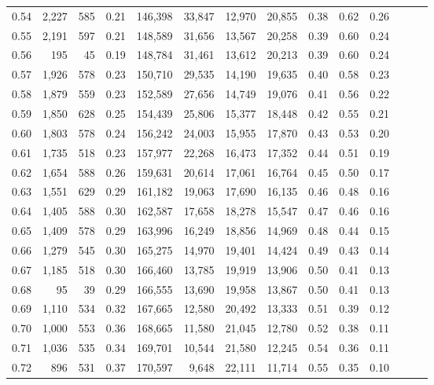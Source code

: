 \begin{tabular}{rrrrrrrrrrrrrr}
0.54 &  2,227 &  585 &  0.21 &  146,398 &   33,847 &  12,970 &  20,855 &  0.38 &  0.62 &      0.26 \\
0.55 &  2,191 &  597 &  0.21 &  148,589 &   31,656 &  13,567 &  20,258 &  0.39 &  0.60 &      0.24 \\
0.56 &    195 &   45 &  0.19 &  148,784 &   31,461 &  13,612 &  20,213 &  0.39 &  0.60 &      0.24 \\
0.57 &  1,926 &  578 &  0.23 &  150,710 &   29,535 &  14,190 &  19,635 &  0.40 &  0.58 &      0.23 \\
0.58 &  1,879 &  559 &  0.23 &  152,589 &   27,656 &  14,749 &  19,076 &  0.41 &  0.56 &      0.22 \\
0.59 &  1,850 &  628 &  0.25 &  154,439 &   25,806 &  15,377 &  18,448 &  0.42 &  0.55 &      0.21 \\
0.60 &  1,803 &  578 &  0.24 &  156,242 &   24,003 &  15,955 &  17,870 &  0.43 &  0.53 &      0.20 \\
0.61 &  1,735 &  518 &  0.23 &  157,977 &   22,268 &  16,473 &  17,352 &  0.44 &  0.51 &      0.19 \\
0.62 &  1,654 &  588 &  0.26 &  159,631 &   20,614 &  17,061 &  16,764 &  0.45 &  0.50 &      0.17 \\
0.63 &  1,551 &  629 &  0.29 &  161,182 &   19,063 &  17,690 &  16,135 &  0.46 &  0.48 &      0.16 \\
0.64 &  1,405 &  588 &  0.30 &  162,587 &   17,658 &  18,278 &  15,547 &  0.47 &  0.46 &      0.16 \\
0.65 &  1,409 &  578 &  0.29 &  163,996 &   16,249 &  18,856 &  14,969 &  0.48 &  0.44 &      0.15 \\
0.66 &  1,279 &  545 &  0.30 &  165,275 &   14,970 &  19,401 &  14,424 &  0.49 &  0.43 &      0.14 \\
0.67 &  1,185 &  518 &  0.30 &  166,460 &   13,785 &  19,919 &  13,906 &  0.50 &  0.41 &      0.13 \\
0.68 &     95 &   39 &  0.29 &  166,555 &   13,690 &  19,958 &  13,867 &  0.50 &  0.41 &      0.13 \\
0.69 &  1,110 &  534 &  0.32 &  167,665 &   12,580 &  20,492 &  13,333 &  0.51 &  0.39 &      0.12 \\
0.70 &  1,000 &  553 &  0.36 &  168,665 &   11,580 &  21,045 &  12,780 &  0.52 &  0.38 &      0.11 \\
0.71 &  1,036 &  535 &  0.34 &  169,701 &   10,544 &  21,580 &  12,245 &  0.54 &  0.36 &      0.11 \\
0.72 &    896 &  531 &  0.37 &  170,597 &    9,648 &  22,111 &  11,714 &  0.55 &  0.35 &      0.10 \\

\end{tabular}
